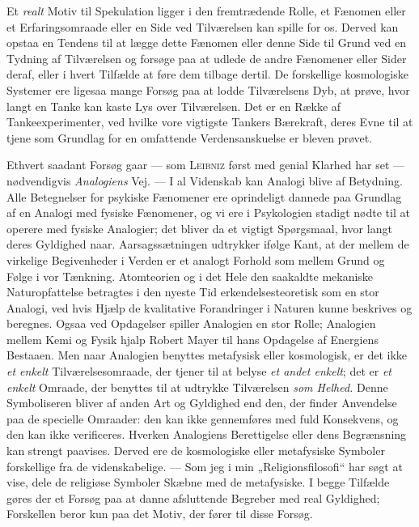 \documentclass[12pt,a4paper,openany]{book}
\newcommand{\opage}[1]{\marginnote{\footnotesize\textit{[#1]}}}
\begin{document}
Et \textit{realt} Motiv til Spekulation ligger i den fremtrædende Rolle, et
Fænomen eller et Erfaringsomraade eller en Side ved Tilværelsen kan spille for
os. Derved kan opstaa en Tendens til at lægge dette Fænomen eller denne Side
til Grund ved en Tydning af Tilværelsen og forsøge paa at udlede de andre
Fænomener eller Sider deraf, eller i hvert Tilfælde at føre dem tilbage dertil.
De forskellige kosmologiske Systemer ere ligesaa mange Forsøg paa at lodde
Tilværelsens Dyb, at prøve, hvor langt en Tanke kan kaste Lys over Tilværelsen.
Det er en Række af Tankeexperimenter, ved hvilke vore vigtigste Tankers
Bærekraft, deres Evne til at tjene som Grundlag for en omfattende
Verdensanskuelse er bleven prøvet.

Ethvert saadant Forsøg gaar --- som \textsc{Leibniz} først med genial Klarhed
har set --- nødvendigvis \textit{Analogiens} Vej. --- I al Videnskab kan
Analogi blive af Betydning. Alle Betegnelser for psykiske Fænomener ere
oprindeligt dannede paa Grundlag af en Analogi med fysiske Fænomener, og vi ere
i Psykologien stadigt nødte til at operere med fysiske Analogier; det bliver da
et vigtigt Spørgsmaal, hvor langt deres Gyldighed naar. Aarsagssætningen
udtrykker ifølge Kant, at der mellem de virkelige Begivenheder i Verden er et
analogt Forhold som mellem Grund og Følge i vor Tænkning. Atomteorien og i det
Hele den saakaldte mekaniske Naturopfattelse betragtes i den nyeste Tid
erkendelsesteoretisk som en stor Analogi, ved hvis Hjælp de kvalitative
Forandringer i Naturen kunne beskrives og beregnes.
\opage{56}Ogsaa ved Opdagelser spiller Analogien en stor Rolle; Analogien
mellem Kemi og Fysik hjalp Robert Mayer til hans Opdagelse af Energiens
Bestaaen. Men naar Analogien benyttes metafysisk eller kosmologisk, er det ikke
\textit{et enkelt} Tilværelsesomraade, der tjener til at belyse \textit{et
andet enkelt}; det er \textit{et enkelt} Omraade, der benyttes til at udtrykke
Tilværelsen \textit{som Helhed.} Denne Symboliseren bliver af anden Art og
Gyldighed end den, der finder Anvendelse paa de specielle Omraader: den kan
ikke gennemføres med fuld Konsekvens, og den kan ikke verificeres. Hverken
Analogiens Berettigelse eller dens Begrænsning kan strengt paavises. Derved ere
de kosmologiske eller metafysiske Symboler forskellige fra de videnskabelige.
--- Som jeg i min „Religionsfilosofi“ har søgt at vise, dele de religiøse
Symboler Skæbne med de metafysiske. I begge Tilfælde gøres der et Forsøg paa at
danne afsluttende Begreber med real Gyldighed; Forskellen beror kun paa det
Motiv, der fører til disse Forsøg.
\end{document}
